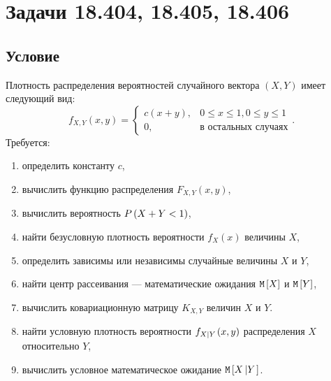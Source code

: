 \section{Задачи 18.404, 18.405, 18.406}
\subsection*{Условие}
Плотность распределения вероятностей случайного вектора $\left ( X, Y \right )$ имеет следующий вид:
$$
f_{X,Y}(x,y)
= \left \{
\begin{array}{ll}
    c ( x + y ), & 0 \le x \le 1, 0 \le y \le 1 \\
    0,           & \text{в остальных случаях}
\end{array}
\right .
.
$$
Требуется:
\begin{enumerate}
    \item определить константу $c$,
    \item вычислить функцию распределения $F_{X,Y}(x,y)$,
    \item вычислить вероятность $P \left ( X + Y < 1 \right )$,
    \item найти безусловную плотность вероятности $f_X(x)$ величины $X$,
    \item определить зависимы или независимы случайные величины $X$ и $Y$,
    \item найти центр рассеивания --- математические ожидания $\mathtt{M} \left [ X \right ]$ и $\mathtt{M} \left [ Y \right ]$,
    \item вычислить ковариационную матрицу $K_{X,Y}$ величин $X$ и $Y$.
    \item найти условную плотность вероятности $f_{X \left | Y \right .}(x,y)$ распределения $X$ относительно $Y$,
    \item вычислить условное математическое ожидание $\mathtt{M} \left [ X \left | Y \right . \right ]$.
\end{enumerate}

